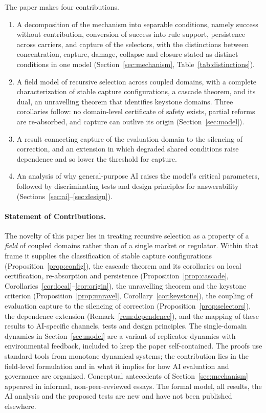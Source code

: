 \documentclass[letterpaper]{article} %
\theoremstyle{definition}
\begin{document}
The paper makes four contributions.
\begin{enumerate}
\item A decomposition of the mechanism into separable conditions, namely success without contribution, conversion of success into rule support, persistence across carriers, and capture of the selectors, with the distinctions between concentration, capture, damage, collapse and closure stated as distinct conditions in one model (Section~\ref{sec:mechanism}, Table~\ref{tab:distinctions}).
\item A field model of recursive selection across coupled domains, with a complete characterization of stable capture configurations, a cascade theorem, and its dual, an unravelling theorem that identifies keystone domains. Three corollaries follow: no domain-level certificate of safety exists, partial reforms are re-absorbed, and capture can outlive its origin (Section~\ref{sec:model}).
\item A result connecting capture of the evaluation domain to the silencing of correction, and an extension in which degraded shared conditions raise dependence and so lower the threshold for capture.
\item An analysis of why general-purpose AI raises the model's critical parameters, followed by discriminating tests and design principles for answerability (Sections~\ref{sec:ai}--\ref{sec:design}).
\end{enumerate}

\paragraph{Statement of Contributions.} The novelty of this paper lies in treating recursive selection as a property of a \emph{field} of coupled domains rather than of a single market or regulator. Within that frame it supplies the classification of stable capture configurations (Proposition~\ref{prop:config}), the cascade theorem and its corollaries on local certification, re-absorption and persistence (Proposition~\ref{prop:cascade}, Corollaries~\ref{cor:local}--\ref{cor:origin}), the unravelling theorem and the keystone criterion (Proposition~\ref{prop:unravel}, Corollary~\ref{cor:keystone}), the coupling of evaluation capture to the silencing of correction (Proposition~\ref{prop:selectors}), the dependence extension (Remark~\ref{rem:dependence}), and the mapping of these results to AI-specific channels, tests and design principles. The single-domain dynamics in Section~\ref{sec:model} are a variant of replicator dynamics with environmental feedback, included to keep the paper self-contained. The proofs use standard tools from monotone dynamical systems; the contribution lies in the field-level formulation and in what it implies for how AI evaluation and governance are organized. Conceptual antecedents of Section~\ref{sec:mechanism} appeared in informal, non-peer-reviewed essays. The formal model, all results, the AI analysis and the proposed tests are new and have not been published elsewhere.
\end{document}
